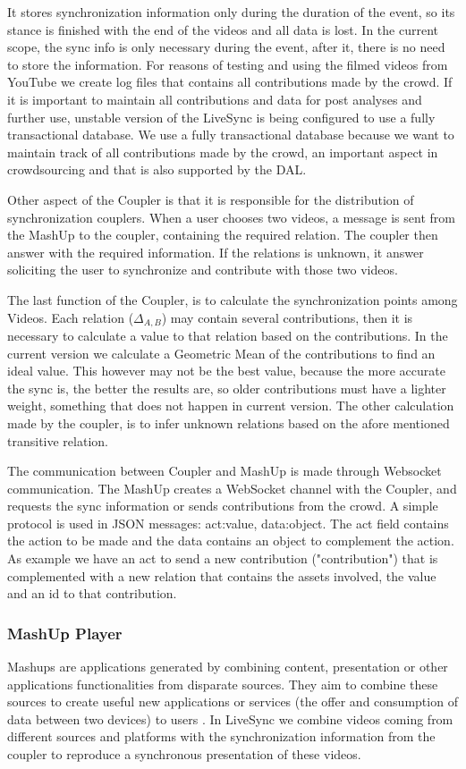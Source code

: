 \documentclass{sig-alternate-05-2015}
\begin{document}
It stores synchronization information only during the duration of the event, so its stance is finished with the end of the videos and all data is lost. In the current scope, the sync info is only necessary during the event, after it, there is no need to store the information. For reasons of testing and using the filmed videos from YouTube we create log files that contains all contributions made by the crowd. If it is important to maintain all contributions and data for post analyses and further use, unstable version of the LiveSync is being configured to use a fully transactional database. We use a fully transactional database because we want to maintain track of all contributions made by the crowd, an important aspect in crowdsourcing and that is also supported by the DAL.

Other aspect of the Coupler is that it is responsible for the distribution of synchronization couplers. When a user chooses two videos, a message is sent from the MashUp to the coupler, containing the required relation. The coupler then answer with the required information. If the relations is unknown, it answer soliciting the user to synchronize and contribute with those two videos.

The last function of the Coupler, is to calculate the synchronization points among Videos. Each relation ($\Delta_{A,B}$) may contain several contributions, then it is necessary to calculate a value to that relation based on the contributions. In the current version we calculate a Geometric Mean of the contributions to find an ideal value. This however may not be the best value, because the more accurate the sync is, the better the results are, so older contributions must have a lighter weight, something that does not happen in current version. The other calculation made by the coupler, is to infer unknown relations based on the afore mentioned transitive relation.

The communication  between Coupler and MashUp is made through Websocket communication. The MashUp creates a WebSocket channel with the Coupler, and requests the sync information or sends contributions from the crowd. A simple protocol is used in JSON messages: {act:value, data:object}. The act field contains the action to be made and the data contains an object to complement the action. As example we have an act to send a new contribution ("contribution") that is complemented with a new relation that contains the assets involved, the value and an id to that contribution.

\subsubsection{MashUp Player}
Mashups are applications generated by combining content, presentation or other applications functionalities from disparate sources. They aim to combine these sources to create useful new applications or services (the offer and consumption of data between two devices) to users \cite{yu2008understanding}. In LiveSync we combine videos coming from different sources and platforms with the synchronization information from the coupler to reproduce a synchronous presentation of these videos.
\end{document}
